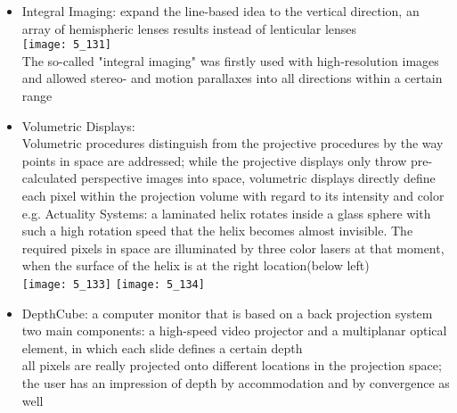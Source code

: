 \documentclass{standalone}
\begin{document}
\begin{itemize}
\begin{itemize}
		\item Integral Imaging: expand the line-based idea to the vertical direction, an array of hemispheric lenses results instead of lenticular lenses \\
		\texttt{[image: 5\_131]} \\
		The so-called "integral imaging" was firstly used with high-resolution images and allowed stereo- and motion parallaxes into all directions within a certain range
		\item Volumetric Displays: \\
		Volumetric procedures distinguish from the projective procedures by the way points in space are addressed; while the projective displays only throw pre-calculated perspective images into space, volumetric displays directly define each pixel within the projection volume with regard to its intensity and color \\
		e.g. Actuality Systems: a laminated helix rotates inside a glass sphere with such a high rotation speed that the helix becomes almost invisible. The required pixels in space are illuminated by three color lasers at that moment, when the surface of the helix is at the right location(below left) \\
		\texttt{[image: 5\_133]} \texttt{[image: 5\_134]}
		\item DepthCube: a computer monitor that is based on a back projection system \\
		two main components: a high-speed video projector and a multiplanar optical element, in which
each slide defines a certain depth \\
		all pixels are really projected onto different locations in the projection space; the user has an impression of depth by accommodation and by convergence as well
	\end{itemize}
	

\end{itemize}
\end{document}
